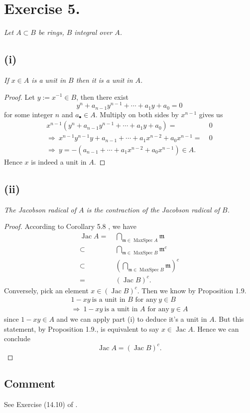 \section{Exercise 5.}
\textit{Let $A\subset B$ be rings, $B$ integral over $A$.}
\subsection{(i)} \textit{If $x\in A$ is a unit in $B$ then it is a unit in $A$.}
\begin{proof}
	Let $y:=x^{-1}\in B$, then there exist 
	\[y^n+a_{n-1}y^{n-1}+\cdots+a_1 y +a_0=0\] for some integer $n$ and $a_{\bullet}\in A$. Multiply on both sides by $x^{n-1}$ gives us 
	\begin{align*}
		x^{n-1}(y^n+a_{n-1}y^{n-1}+\cdots+a_1 y +a_0)=&~0\\
		\Rightarrow~ x^{n-1}y^{n-1}y+a_{n-1}+\cdots+a_1x^{n-2}+a_0x^{n-1}=&~0\\
		\Rightarrow~ y=-(a_{n-1}+\cdots+a_1x^{n-2}+a_0x^{n-1})\in A.
	\end{align*}Hence $x$ is indeed a unit in $A$.
\end{proof}

\subsection{(ii)}\textit{The Jacobson radical of $A$ is the contraction of the Jacobson radical of $B$.}
\begin{proof}
	According to Corollary 5.8 \cite{atiyah1994introduction}, we have 
	\begin{align*}
		\operatorname{Jac}A=&~ \bigcap_{\mathfrak m\in\operatorname{MaxSpec}A}\mathfrak m\\
		\subset&~ \bigcap_{\mathfrak m\in\operatorname{MaxSpec}B}\mathfrak m^c\\
		\subset&~ (\bigcap_{\mathfrak m\in\operatorname{MaxSpec}B}\mathfrak m)^c\\
		=&~ (\operatorname{Jac}B)^c.
	\end{align*}
	Conversely, pick an element $x\in (\operatorname{Jac}B)^c$. Then we know by Proposition 1.9. \cite{atiyah1994introduction}
	\begin{align*}
		1-xy ~\text{is a unit in $B$ for any}~ y\in B\\
		\Rightarrow~ 1-xy ~\text{is a unit in $A$ for any}~ y\in A
	\end{align*}since $1-xy\in A$ and we can apply part (i) to deduce it's a unit in $A$. But this statement, by Proposition 1.9., is equivalent to say $x\in\operatorname{Jac}A$. Hence we can conclude \[\operatorname{Jac}A=(\operatorname{Jac}B)^c.\]
\end{proof}
\subsection{Comment}

See Exercise (14.10) of \cite{altman}.
